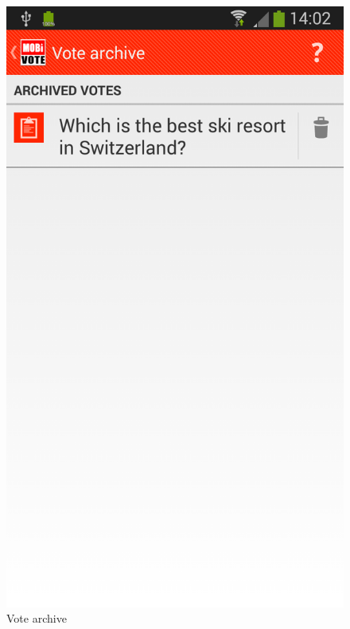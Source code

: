 \documentclass[numbers=noenddot, abstract=on, a4paper, headsepline,
footsepline, oneside, openright, draft=off, listof=leveldown]{scrreprt}
\begin{document}
\begin{figure}[!htb]
	\centering
	\includegraphics[height=.4\textheight]{img/screenshots/vote_archive}
	\caption{Vote archive}
	\label{fig:handbook_votearchive}
\end{figure}
\end{document}
